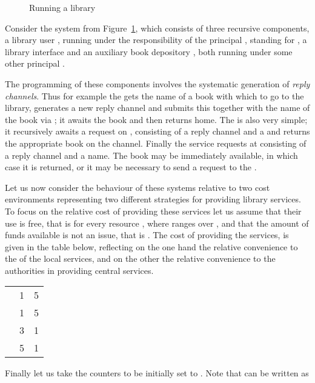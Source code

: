 \documentclass{LMCS}
\begin{document}
\begin{figure}[t]


  
  \caption{Running a library}
  \label{fig:lib}
\end{figure}



\begin{exa}\label{ex:lib}
  

Consider the system  from Figure~\ref{fig:lib}, which consists
of three recursive components, a library user , running under
the responsibility of the principal , standing for , 
a library interface  and an auxiliary book depository , both running
under some other principal .

The programming of these components
involves the systematic generation of \emph{reply channels}. Thus for example 
the  gets the name of a book with which to go to the library, generates 
a new reply channel  and submits  this together with the name of the book via 
; it awaits the book and then returns home.  The  is also very simple;
it recursively awaits a request on , consisting of a reply channel and a 
and returns the appropriate book on the channel. Finally the 
service requests at  consisting of a reply channel and a name. The book may be immediately
available, in which case it is returned, or it may be necessary to send a request to the . 

Let us now consider the behaviour of these systems relative to two
cost environments  representing
two different strategies for providing library services.  To focus on
the relative cost of providing these services let us assume that their
use is free, that is  for every resource , where  ranges over
, and that 
the amount of funds available is not an issue, that is 
.  The
cost of providing the services,  is given in the table
below, reflecting on the one hand the relative convenience to the  
of the local services, and on the other the relative convenience to the
authorities in providing central services.


\begin{center}
\begin{tabular}{|l|| c | c|}
\hline
          & &\\\hline
    & 1       &5\\\hline
   & 1       &5\\\hline
     & 3       &1\\\hline
      & 5       &1\\\hline
\end{tabular}
\end{center}
Finally let us take the counters
 to be initially set to . 
Note that  can be written as


\end{exa}
\end{document}
